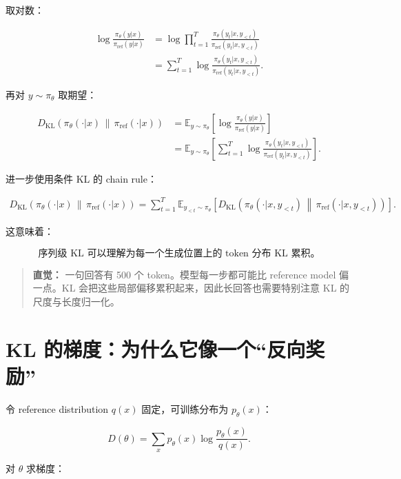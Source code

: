 \documentclass[11pt,a4paper]{ctexart}
\newcommand{\KL}[2]{D_{\mathrm{KL}}\!\left(#1\,\middle\|\,#2\right)}
\newcommand{\E}{\mathbb{E}}
\newcommand{\piref}{\pi_{\mathrm{ref}}}
\newcommand{\pitheta}{\pi_{\theta}}
\newenvironment{intuition}
{\begin{quote}\small\textbf{直觉：}}
{\end{quote}}
\begin{document}
取对数：

\begin{align}
\log
\frac{\pitheta(y|x)}{\piref(y|x)}
&=
\log
\prod_{t=1}^{T}
\frac{
\pitheta(y_t|x,y_{<t})
}{
\piref(y_t|x,y_{<t})
}
\\
&=
\sum_{t=1}^{T}
\log
\frac{
\pitheta(y_t|x,y_{<t})
}{
\piref(y_t|x,y_{<t})
}.
\label{eq:sequence_log_ratio}
\end{align}

再对 $y\sim\pitheta$ 取期望：

\begin{align}
\KL{\pitheta(\cdot|x)}{\piref(\cdot|x)}
&=
\E_{y\sim\pitheta}
\left[
\log
\frac{\pitheta(y|x)}{\piref(y|x)}
\right]
\\
&=
\E_{y\sim\pitheta}
\left[
\sum_{t=1}^{T}
\log
\frac{
\pitheta(y_t|x,y_{<t})
}{
\piref(y_t|x,y_{<t})
}
\right].
\label{eq:sequence_kl}
\end{align}

进一步使用条件 KL 的 chain rule：

\begin{align}
\KL{\pitheta(\cdot|x)}{\piref(\cdot|x)}
=
\sum_{t=1}^{T}
\E_{y_{<t}\sim\pitheta}
\left[
\KL{
\pitheta(\cdot|x,y_{<t})
}{
\piref(\cdot|x,y_{<t})
}
\right].
\label{eq:token_chain_rule}
\end{align}

这意味着：

\begin{equation}
\boxed{
\text{序列级 KL 可以理解为每一个生成位置上的 token 分布 KL 累积。}
}
\end{equation}

\begin{intuition}
一句回答有 500 个 token。模型每一步都可能比 reference model 偏一点。KL 会把这些局部偏移累积起来，因此长回答也需要特别注意 KL 的尺度与长度归一化。
\end{intuition}

\section{KL 的梯度：为什么它像一个“反向奖励”}

令 reference distribution $q(x)$ 固定，可训练分布为 $p_\theta(x)$：

\begin{equation}
D(\theta)
=
\sum_x
p_\theta(x)
\log
\frac{p_\theta(x)}{q(x)}.
\end{equation}

对 $\theta$ 求梯度：
\end{document}
